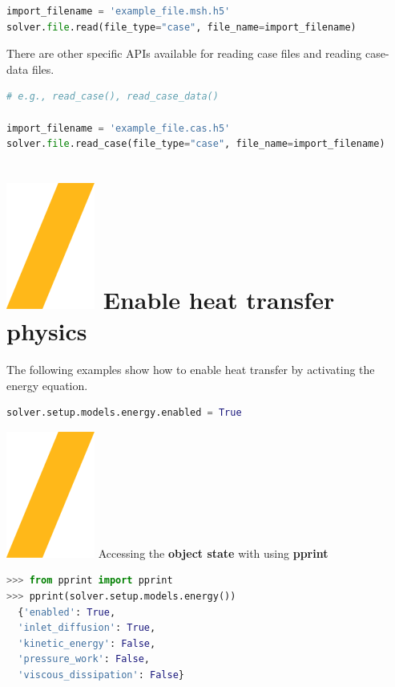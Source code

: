 \documentclass[9pt,landscape]{article}
\begin{document}
\begin{multicols}{3}
\begin{lstlisting}[language=Python]
import_filename = 'example_file.msh.h5'
solver.file.read(file_type="case", file_name=import_filename)
\end{lstlisting}

There are other specific APIs available for reading case files and
reading case-data files. 

\begin{lstlisting}[language=Python]
# e.g., read_case(), read_case_data()

import_filename = 'example_file.cas.h5'
solver.file.read_case(file_type="case", file_name=import_filename)  
\end{lstlisting}


\section{\includegraphics[height=\fontcharht\font`\S]{slash.png} Enable heat transfer physics}

The following examples show how to enable heat transfer by activating the energy equation.

\begin{lstlisting}[language=Python]
solver.setup.models.energy.enabled = True
\end{lstlisting}

{\includegraphics[height=\fontcharht\font`\S]{slash.png} Accessing the \textbf{object state} with using \textbf{pprint}

\begin{lstlisting}[language=Python]
>>> from pprint import pprint
>>> pprint(solver.setup.models.energy())
  {'enabled': True,
  'inlet_diffusion': True,
  'kinetic_energy': False,
  'pressure_work': False,
  'viscous_dissipation': False}  
\end{lstlisting}


}
\end{multicols}
\end{document}
